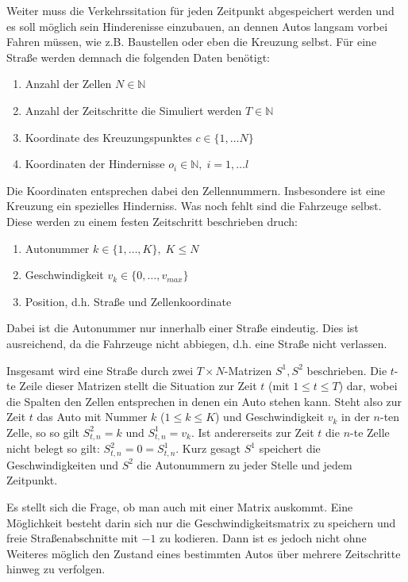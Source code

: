 Weiter muss die Verkehrssitation für jeden Zeitpunkt abgespeichert werden und
es soll möglich sein Hinderenisse einzubauen, an dennen Autos langsam vorbei Fahren müssen, 
wie z.B. Baustellen oder eben die Kreuzung selbst. 
Für eine Straße werden demnach die folgenden Daten benötigt:
\begin{enumerate}
  \item Anzahl der Zellen \(N \in \mathbb{N}\)
  \item Anzahl der Zeitschritte die Simuliert werden \(T \in \mathbb{N}\)
  \item Koordinate des Kreuzungspunktes \(c \in \{ 1, \ldots N \}\)
  \item Koordinaten der Hindernisse \(o_i \in \mathbb{N}, \; i = 1, \ldots l\)
\end{enumerate}
Die Koordinaten entsprechen dabei den Zellennummern. Insbesondere ist eine Kreuzung ein spezielles Hinderniss. 
Was noch fehlt sind die Fahrzeuge selbst. Diese werden zu einem festen Zeitschritt beschrieben druch:
\begin{enumerate}
  \item Autonummer \(k \in \{ 1, \ldots, K \}, \; K \leq N\) 
  \item Geschwindigkeit \(v_k \in \{0, \ldots, v_{max} \}\)
  \item Position, d.h. Straße und Zellenkoordinate
\end{enumerate}
Dabei ist die Autonummer nur innerhalb einer Straße eindeutig. Dies ist ausreichend, da die Fahrzeuge nicht 
abbiegen, d.h. eine Straße nicht verlassen.

Insgesamt wird eine Straße durch zwei \(T \times N\)-Matrizen \(S^1, S^{2}\) beschrieben.
Die \(t\)-te Zeile dieser Matrizen stellt die Situation zur Zeit \(t\) (mit \(1 \leq t \leq T\)) dar, 
wobei die Spalten den Zellen entsprechen in denen ein Auto stehen kann. 
Steht also zur Zeit \(t\) das Auto mit Nummer \(k\) (\(1 \leq k \leq K\)) und Geschwindigkeit \(v_k\) in der \(n\)-ten Zelle, 
so so gilt \( S^{2}_{t, n} = k\) und \(S^{1}_{t, n} = v_k\). 
Ist andererseits zur Zeit \(t\) die \(n\)-te Zelle nicht belegt so gilt: \(S^2_{t, n} = 0 = S^1_{t, n}\).
Kurz gesagt \(S^{1}\) speichert die Geschwindigkeiten und \(S^{2}\) die Autonummern zu jeder Stelle und jedem Zeitpunkt.

Es stellt sich die Frage, ob man auch mit einer Matrix auskommt. Eine Möglichkeit besteht darin sich nur die Geschwindigkeitsmatrix 
zu speichern und freie Straßenabschnitte mit \(-1\) zu kodieren. Dann ist es jedoch nicht ohne Weiteres möglich den Zustand eines bestimmten Autos über
mehrere Zeitschritte hinweg zu verfolgen.
